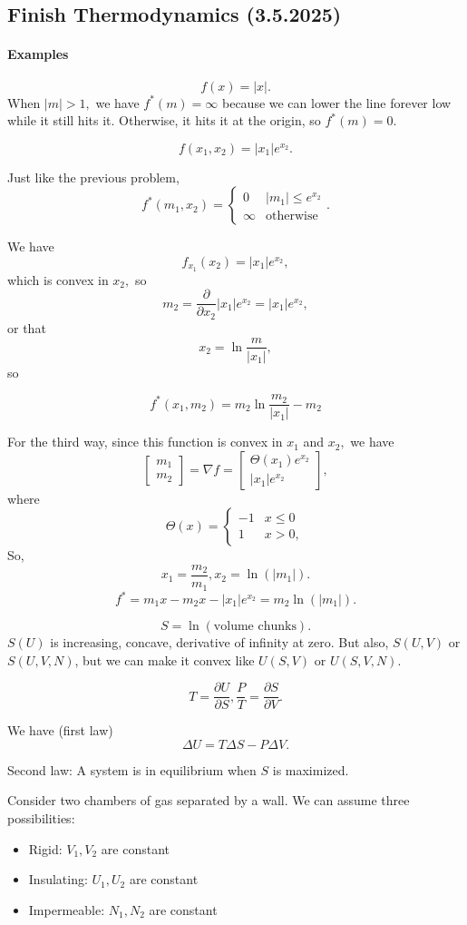 \documentclass[12pt]{article}
\theoremstyle{remark}
\begin{document}
\subsection{Finish Thermodynamics (3.5.2025)}
\paragraph{Examples}
\[f(x)=|x|.\]
When $|m|>1,$ we have $f^\ast(m)=\infty$ because we can lower the line forever low while it still hits it.
Otherwise, it hits it at the origin, so $f^\ast(m)=0.$

\[f(x_1,x_2)=|x_1|e^{x_2}.\]

Just like the previous problem,
\[f^\ast(m_1,x_2)=\begin{cases}
    0&|m_1|\le e^{x_2}\\
    \infty & \text{otherwise}
\end{cases}.\]

We have
\[f_{x_1}(x_2)=|x_1|e^{x_2},\] which is convex in $x_2,$ so
\[m_2=\frac{\partial}{\partial x_2}|x_1|e^{x_2}=|x_1|e^{x_2},\] or that
\[x_2=\ln\frac{m}{|x_1|},\] so

\[f^\ast(x_1,m_2)=m_2\ln\frac{m_2}{|x_1|}-m_2\]

For the third way, since this function is convex in $x_1$ and $x_2,$ we have
\[\begin{bmatrix}
    m_1\\m_2
\end{bmatrix}=\nabla f=\begin{bmatrix}
    \Theta(x_1)e^{x_2}\\|x_1|e^{x_2}
\end{bmatrix},\]
where
\[\Theta(x)=\begin{cases}
    -1&x\le 0\\
    1&x>0,
\end{cases}\]
So,
\[x_1=\frac{m_2}{m_1},x_2=\ln(|m_1|).\]
\[f^\ast=m_1x-m_2x-|x_1|e^{x_2}=m_2\ln(|m_1|).\]

\[S=\ln(\text{volume chunks}).\]
$S(U)$ is increasing, concave, derivative of infinity at zero.
But also, $S(U,V)$ or $S(U,V,N)$, but we can make it convex like $U(S,V)$ or $U(S,V,N)$.

\[T=\frac{\partial U}{\partial S},\frac{P}{T}=\frac{\partial S}{\partial V}.\] 

We have (first law)
\[\Delta U=T\Delta S-P\Delta V.\]

Second law:
A system is in equilibrium when $S$ is maximized. 

Consider two chambers of gas separated by a wall. We can assume three possibilities:
\begin{itemize}
    \item Rigid: $V_1,V_2$ are constant
    \item Insulating: $U_1,U_2$ are constant
    \item Impermeable: $N_1,N_2$ are constant
\end{itemize}
\end{document}
